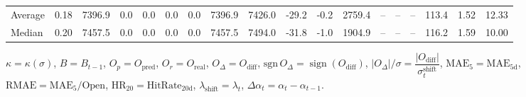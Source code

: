 \begin{threeparttable}
{\begin{tabular}{lrrrrrrrrrrrrrrrrr}
Average &     0.18 & 7396.9 &               0.0 &               0.0 &                0.0 &                0.0 & 7396.9 & 7426.0 &      -29.2 &                     -0.2 &              2759.4 &         -- &        -- &             -- &            113.4 &            1.52 &                  12.33 \\
 Median &     0.20 & 7457.5 &               0.0 &               0.0 &                0.0 &                0.0 & 7457.5 & 7494.0 &      -31.8 &                     -1.0 &              1904.9 &         -- &        -- &             -- &            116.2 &            1.59 &                  10.00 \\
\bottomrule
\end{tabular}
}
\begin{tablenotes}\footnotesize
\item $\kappa=\kappa(\sigma)$, $B=B_{t-1}$, $O_p=O_{\text{pred}}$, $O_r=O_{\text{real}}$, $O_\Delta=O_{\text{diff}}$, $\mathrm{sgn}\,O_\Delta=\operatorname{sign}(O_{\text{diff}})$, $|O_\Delta|/\sigma=\dfrac{|O_{\text{diff}}|}{\sigma_t^{\text{shift}}}$, $\mathrm{MAE}_5=\mathrm{MAE}_{5\text{d}}$, $\mathrm{RMAE}= \mathrm{MAE}_5 / \text{Open}$, $\mathrm{HR}_{20}=\mathrm{HitRate}_{20\text{d}}$, 
$\lambda_{\text{shift}}=\lambda_t$, 
$\Delta\alpha_t=\alpha_t-\alpha_{t-1}$.
\end{tablenotes}
\end{threeparttable}
\endgroup

